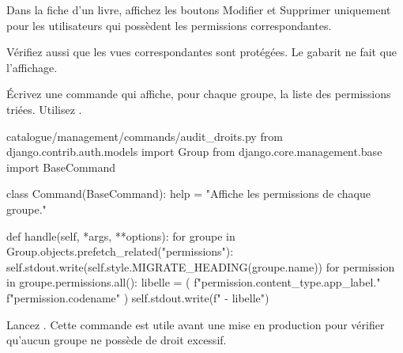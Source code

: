 \begin{exercice}
Dans la fiche d'un livre, affichez les boutons \og Modifier \fg{} et
\og Supprimer \fg{} uniquement pour les utilisateurs qui possèdent les permissions
correspondantes.
\end{exercice}

\begin{correction}

Vérifiez aussi que les vues correspondantes sont protégées. Le gabarit ne fait que
l'affichage.
\end{correction}

\begin{exercice}
Écrivez une commande  qui affiche, pour chaque groupe, la liste
des permissions triées. Utilisez .
\end{exercice}

\begin{correction}
\begin{codebox}[python]{catalogue/management/commands/audit\_droits.py}
from django.contrib.auth.models import Group
from django.core.management.base import BaseCommand


class Command(BaseCommand):
    help = "Affiche les permissions de chaque groupe."

    def handle(self, *args, **options):
        for groupe in Group.objects.prefetch_related("permissions"):
            self.stdout.write(self.style.MIGRATE_HEADING(groupe.name))
            for permission in groupe.permissions.all():
                libelle = (
                    f"{permission.content_type.app_label}."
                    f"{permission.codename}"
                )
                self.stdout.write(f"  - {libelle}")
\end{codebox}

Lancez . Cette commande est utile avant une
mise en production pour vérifier qu'aucun groupe ne possède de droit excessif.
\end{correction}

